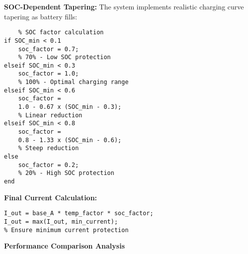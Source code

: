 \documentclass[conference]{IEEEtran}
\begin{document}
\textbf{SOC-Dependent Tapering:} The system implements realistic charging curve tapering as battery fills:

\begin{verbatim}
    % SOC factor calculation
if SOC_min < 0.1
    soc_factor = 0.7;        
    % 70% - Low SOC protection
elseif SOC_min < 0.3
    soc_factor = 1.0;        
    % 100% - Optimal charging range
elseif SOC_min < 0.6
    soc_factor = 
    1.0 - 0.67 x (SOC_min - 0.3);  
    % Linear reduction
elseif SOC_min < 0.8
    soc_factor = 
    0.8 - 1.33 x (SOC_min - 0.6);  
    % Steep reduction
else
    soc_factor = 0.2;        
    % 20% - High SOC protection
end
\end{verbatim}

\textbf{Final Current Calculation:} 

\begin{verbatim}
I_out = base_A * temp_factor * soc_factor;
I_out = max(I_out, min_current); 
% Ensure minimum current protection
\end{verbatim}

\textbf{Performance Comparison Analysis}
\begin{table}[h]
\centering
\caption{Temperature Response Characteristics (at T = $25^\circ$C}
\scriptsize
\setlength{\tabcolsep}{3pt}
\end{table}
\end{document}
